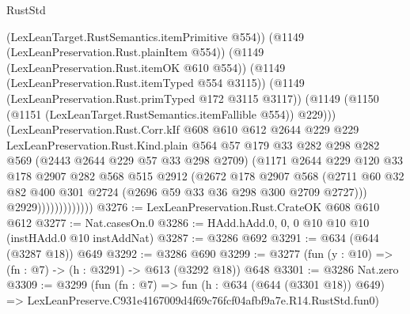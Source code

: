 \begin{lexlean}{RustStd}
\begin{coremodule}
                              (LexLeanTarget.RustSemantics.itemPrimitive @554))
                            (@1149 (LexLeanPreservation.Rust.plainItem @554))
                            (@1149 (LexLeanPreservation.Rust.itemOK @610 @554))
                            (@1149 (LexLeanPreservation.Rust.itemTyped @554 @3115))
                            (@1149 (LexLeanPreservation.Rust.primTyped @172 @3115 @3117))
                            (@1149
                              (@1150 (@1151 (LexLeanTarget.RustSemantics.itemFallible @554)) @229)))
                          (LexLeanPreservation.Rust.Corr.kIf
                            @608
                            @610
                            @612
                            @2644
                            @229
                            @229
                            LexLeanPreservation.Rust.Kind.plain
                            @564
                            @57
                            @179
                            @33
                            @282
                            @298
                            @282
                            @569
                            (@2443 @2644 @229 @57 @33 @298 @2709)
                            (@1171
                              @2644
                              @229
                              @120
                              @33
                              @178
                              @2907
                              @282
                              @568
                              @515
                              @2912
                              (@2672
                                @178
                                @2907
                                @568
                                (@2711
                                  @60
                                  @32
                                  @82
                                  @400
                                  @301
                                  @2724
                                  (@2696 @59 @33 @36 @298 @300 @2709 @2727)))
                              @2929)))))))))))))
@3276 := LexLeanPreservation.Rust.CrateOK @608 @610 @612
@3277 := Nat.casesOn.{0}
@3286 := HAdd.hAdd.{0, 0, 0} @10 @10 @10 (instHAdd.{0} @10 instAddNat)
@3287 := @3286 @692
@3291 := @634 (@644 (@3287 @18)) @649
@3292 := @3286 @690
@3299 := @3277 (fun (y : @10) => (fn : @7) -> (h : @3291) -> @613 (@3292 @18)) @648
@3301 := @3286 Nat.zero
@3309 := @3299
    (fun (fn : @7) =>
    fun (h : @634 (@644 (@3301 @18)) @649) =>
    LexLeanPreserve.C931e4167009d4f69c76fcf04afbf9a7e.R14.RustStd.fun0)

\end{coremodule}
\end{lexlean}
